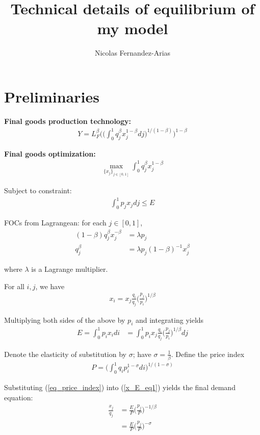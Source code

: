 \documentclass[12pt,english]{article}
\theoremstyle{remark}
\begin{document}
\title{Technical details of equilibrium of my model}
\author{Nicolas Fernandez-Arias}
\maketitle

\section{Preliminaries}
\textbf{Final goods production technology:}
\begin{align}
Y = L_F^{\beta}\Bigg( \Big(\int_0^1 q_j^{\beta} x_j^{1-\beta} dj \Big)^{1/(1-\beta)} \Bigg)^{1-\beta} \label{final_good_technology}
\end{align}

\textbf{Final goods optimization:}
\begin{align*}
\max_{\{x_j\}_{j\in [0,1]}} \int_0^1 q_j^{\beta} x_j^{1-\beta} 
\end{align*}

Subject to constraint:  
\begin{align*}
\int_0^1 p_j x_j dj \le E
\end{align*}

FOCs from Lagrangean: for each $j \in [0,1]$, 
\begin{align*}
(1-\beta)q_j^{\beta} x_j^{-\beta} &= \lambda p_j \\
					 q_j^{\beta}  &= \lambda p_j (1-\beta)^{-1} x_j^{\beta}
\end{align*}

where $\lambda$ is a Lagrange multiplier. 

For all $i,j$, we have 
\begin{align*}
x_i = x_j \frac{q_i}{q_j} \Big(\frac{p_j}{p_i}\Big)^{1/\beta}
\end{align*}

Multiplying both sides of the above by $p_i$ and integrating yields
\begin{align}
E = \int_0^1 p_i x_i di &= \int_0^1 p_i x_j \frac{q_i}{q_j} \Big(\frac{p_j}{p_i}\Big)^{1/\beta} dj \label{x_E_eq1}
\end{align}

Denote the elasticity of substitution by $\sigma$; have $\sigma = \frac{1}{\beta}$. Define the price index
\begin{align}
P = \Big(\int_0^1 q_i p_i^{1-\sigma} di \Big)^{1/(1-\sigma)} \label{eq_price_index}
\end{align}

Substituting (\ref{eq_price_index}) into (\ref{x_E_eq1}) yields the final demand equation:
\begin{align}
\frac{x_j}{q_j} &= \frac{E}{P} \Big(\frac{p_j}{P}\Big)^{-1/\beta} \label{eq_x_demand_betaversion} \\
			    &= \frac{E}{P} \Big(\frac{p_j}{P}\Big)^{-\sigma} \label{eq_x_demand}
\end{align}
\end{document}
